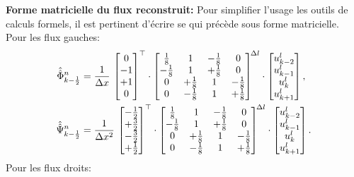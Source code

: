 \textbf{Forme matricielle du flux reconstruit: }
Pour simplifier l'usage les outils de calculs formels, il est pertinent d'écrire se qui précède sous forme matricielle.\\
Pour les flux gauches:
\begin{align}
\hat{\hat{\Phi}}_{k-\frac12}^n
&= \frac{1}{\Delta x}\,
\begin{bmatrix}0 \\ -1 \\ +1 \\ 0\end{bmatrix}^\top \cdot
\begin{bmatrix}
\frac{1}{8} & 1 & -\frac{1}{8} & 0\\
-\frac{1}{8} & 1 & +\frac{1}{8} & 0\\
0 & +\frac{1}{8} & 1 & -\frac{1}{8}\\
0 & -\frac{1}{8} & 1 & +\frac{1}{8}
\end{bmatrix}^{\!\Delta l} \cdot
\begin{bmatrix}
u^l_{k-2}\\ u^l_{k-1}\\ u^l_{k}\\ u^l_{k+1}
\end{bmatrix},\\
\hat{\hat{\Psi}}_{k-\frac12}^n
&= \frac{1}{\Delta x^2}\,
\begin{bmatrix}-\tfrac12 \\ +\tfrac32 \\ -\tfrac32 \\ +\tfrac12\end{bmatrix}^\top \cdot
\begin{bmatrix}
\frac{1}{8} & 1 & -\frac{1}{8} & 0\\
-\frac{1}{8} & 1 & +\frac{1}{8} & 0\\
0 & +\frac{1}{8} & 1 & -\frac{1}{8}\\
0 & -\frac{1}{8} & 1 & +\frac{1}{8}
\end{bmatrix}^{\!\Delta l} \cdot
\begin{bmatrix}
u^l_{k-2}\\ u^l_{k-1}\\ u^l_{k}\\ u^l_{k+1}
\end{bmatrix}.
\end{align}
Pour les flux droits:

